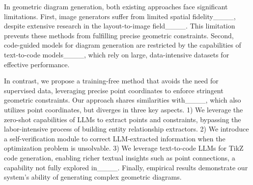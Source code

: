 In geometric diagram generation, both existing approaches face significant limitations. First, image generators suffer from limited spatial fidelity____, despite extensive research in the layout-to-image field____. This limitation prevents these methods from fulfilling precise geometric constraints.
Second, code-guided models for diagram generation are restricted by the capabilities of text-to-code models____, which rely on large, data-intensive datasets for effective performance.

In contrast, we propose a training-free method that avoids the need for supervised data, leveraging precise point coordinates to enforce stringent geometric constraints. Our approach shares similarities with____, which also utilizes point coordinates, but diverges in three key aspects. 1) We leverage the zero-shot capabilities of LLMs to extract points and constraints, bypassing the labor-intensive process of building entity relationship extractors. 2) We introduce a self-verification module to correct LLM-extracted information when the optimization problem is unsolvable. 3) We leverage text-to-code LLMs for TikZ code generation, enabling richer textual insights such as point connections, a capability not fully explored in____. Finally, empirical results demonstrate our system's ability of generating complex geometric diagrams.









